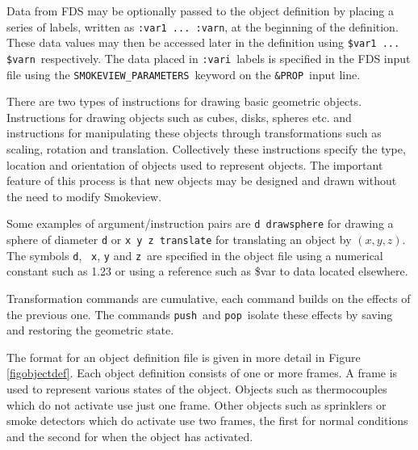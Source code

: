 \documentclass[11pt,twoside]{book}
\begin{document}
Data from FDS may be optionally passed to the object definition by
placing a series of labels, written as {\tt :var1 ... :varn}, at
the beginning of the definition.  These data values may then be
accessed later in the definition using {\tt \$var1 ... \$varn}\
respectively. The data placed in {\tt :vari}\ labels is specified
in the FDS input  file using the {\tt SMOKEVIEW\_PARAMETERS}\
keyword on the {\tt \&PROP}\ input line.

There are two types of instructions for drawing basic geometric
objects.  Instructions for drawing objects such as cubes, disks,
spheres etc.  and instructions for manipulating these objects
through transformations such as scaling, rotation and translation.
Collectively these instructions specify the type, location and
orientation of objects used to represent objects.  The important
feature of this process is that new objects may be designed and
drawn without the need to modify Smokeview.

Some examples of argument/instruction pairs are {\tt d drawsphere}
for drawing a sphere of diameter {\tt d} or {\tt x y z translate}
for translating an object by $(x,y,z)$. The symbols {\tt d}, {\tt
x}, {\tt y} and {\tt z}\ are specified in the object file using a
numerical constant such as 1.23 or using a reference such as \$var
to data located elsewhere.

Transformation commands are cumulative, each command builds on the effects of the previous one.  The commands {\tt push}\ and {\tt pop}\ isolate these effects by saving and restoring the geometric state.

The format for an object definition file is given in more detail in Figure \ref{figobjectdef}.  Each object definition consists of one or more frames.  A frame is used to represent various states of the object. Objects such as thermocouples which do not activate use just one frame. Other objects such as sprinklers or smoke detectors which do activate use two frames, the first for normal conditions and the second for when the object has activated.
\end{document}
